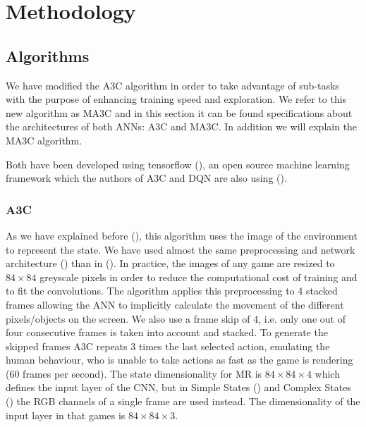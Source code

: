 \chapter{Methodology}

\section{Algorithms}

We have modified the \ac{A3C} algorithm in order to take advantage of sub-tasks with the purpose of enhancing training speed
and exploration.
We refer to this new algorithm as \acf{MA3C} and in this section it can be found specifications about the architectures of
both \acp{ANN}: \ac{A3C} and \ac{MA3C}.
In addition we will explain the \ac{MA3C} algorithm.

Both have been developed using tensorflow (\cite{tensorflow2015}), an open source machine learning framework which the authors
of \ac{A3C} and \ac{DQN} are also using (\cite{deepmind_tensorflow}).

\subsection{\acl{A3C}\label{subsec:AlgorithmA3C}}

As we have explained before (), this algorithm uses the image of the environment to represent the state.
We have used almost the same preprocessing and network architecture () than in  (\cite{mnih2016A3C}).
In practice, the images of any game are resized to $84 \times 84$ greyscale pixels in order to reduce the computational cost of training and to fit the convolutions.
The algorithm applies this preprocessing to 4 stacked frames allowing the \ac{ANN} to implicitly calculate the movement
of the different pixels/objects on the screen.
We also use a frame skip of 4, i.e. only one out of four consecutive frames is taken into account and stacked.
To generate the skipped frames \ac{A3C} repeats 3 times the last selected action, emulating the human behaviour, who is
unable to take actions as fast as the game is rendering (60 frames per second).
The state dimensionality for \ac{MR} is $84 \times 84 \times 4$ which defines the input layer of the \ac{CNN}, but in Simple States
() and Complex States ()
the RGB channels of a single frame are used instead.
The dimensionality of the input layer in that games is $84 \times 84 \times 3$.

